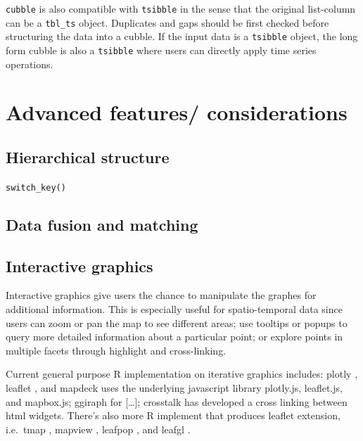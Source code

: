 \documentclass[
]{jss}
\begin{document}
\texttt{cubble} is also compatible with \texttt{tsibble} in the sense
that the original list-column can be a \texttt{tbl\_ts} object.
Duplicates and gaps should be first checked before structuring the data
into a cubble. If the input data is a \texttt{tsibble} object, the long
form cubble is also a \texttt{tsibble} where users can directly apply
time series operations.

\hypertarget{advanced-features-considerations}{%
\section{Advanced features/
considerations}\label{advanced-features-considerations}}

\hypertarget{hierarchical-structure}{%
\subsection{Hierarchical structure}\label{hierarchical-structure}}

\texttt{switch\_key()}

\hypertarget{data-fusion-and-matching}{%
\subsection{Data fusion and matching}\label{data-fusion-and-matching}}

\hypertarget{interactive-graphics}{%
\subsection{Interactive graphics}\label{interactive-graphics}}

Interactive graphics give users the chance to manipulate the graphes for
additional information. This is especially useful for spatio-temporal
data since users can zoom or pan the map to see different areas; use
tooltips or popups to query more detailed information about a particular
point; or explore points in multiple facets through highlight and
cross-linking.

Current general purpose R implementation on iterative graphics includes:
plotly \citep{plotly}, leaflet \citep{leaflet}, and mapdeck
\citep{mapdeck} uses the underlying javascript library plotly.js,
leaflet.js, and mapbox.js; ggiraph \citep{ggiraph} for {[}\ldots{]};
crosstalk \citep{crosstalk} has developed a cross linking between html
widgets. There's also more R implement that produces leaflet extension,
i.e.~tmap \citep{map}, mapview \citep{mapview}, leafpop \citep{leafpop},
and leafgl \citep{leafgl}.
\end{document}
